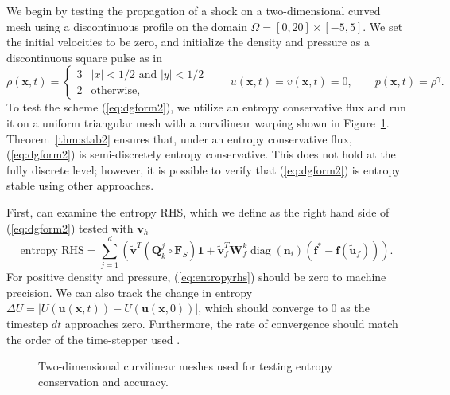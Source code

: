 \documentclass[preprint,10pt]{article}
\theoremstyle{definition}
\theoremstyle{lemma}
\theoremstyle{theorem}
\theoremstyle{assumption}
\DeclareMathOperator{\diag}{diag}
\renewcommand{\tilde}{\widetilde}
\newcommand{\LRp}[1]{\left( #1 \right)}
\newcommand{\LRb}[1]{\left| #1 \right|}
\begin{document}
{We begin by testing the propagation of a shock on a two-dimensional curved mesh using a discontinuous profile on the domain $\Omega = [0,20] \times [-5,5]$.   We set the initial velocities to be zero, and initialize the density and pressure as a discontinuous square pulse as in \cite{chan2017discretely}
\begin{equation}
\rho(\bm{x},t) = \begin{cases}
3 & \LRb{x} < 1/2 \text{ and } \LRb{y} < 1/2\\
2 & \text{otherwise},
\end{cases} \qquad 
u(\bm{x},t) = v(\bm{x},t) = 0, \qquad
p(\bm{x},t) = \rho^\gamma.
\label{eq:discontin}
\end{equation}
To test the scheme (\ref{eq:dgform2}), we utilize an entropy conservative flux and run it on a uniform triangular mesh with a curvilinear warping shown in Figure~\ref{fig:warp2d}.   Theorem~\ref{thm:stab2} ensures that, under an entropy conservative flux, (\ref{eq:dgform2}) is semi-discretely entropy conservative.  This does not hold at the fully discrete level; however, it is possible to verify that (\ref{eq:dgform2}) is entropy stable using other approaches.  

First, can examine the entropy RHS, which we define as the right hand side of (\ref{eq:dgform2}) tested with $\bm{v}_h$
\begin{equation}
\text{entropy RHS}= \sum_{j=1}^d\LRp{ \tilde{\bm{v}}^T\LRp{\bm{Q}^j_k \circ \bm{F}_S}\bm{1} + \tilde{\bm{v}}_f^T\bm{W}_f^k \diag\LRp{\bm{n}_i}\LRp{\bm{f}^* - \bm{f}(\tilde{\bm{u}}_f)}}.  
\label{eq:entropyrhs}
\end{equation}
For positive density and pressure, (\ref{eq:entropyrhs}) should be zero to machine precision.  We can also track the change in entropy $\Delta U = \LRb{U(\bm{u}(\bm{x},t))-U(\bm{u}(\bm{x},0))}$, which should converge to $0$ as the timestep $dt$ approaches zero.  Furthermore, the rate of convergence should match the order of the time-stepper used \cite{gassner2016well,chan2017discretely}.  

\begin{figure}
\centering
{}
\hspace{1em}
\caption{Two-dimensional curvilinear meshes used for testing entropy conservation and accuracy.}
\label{fig:warp2d}
\end{figure}

}
\end{document}
